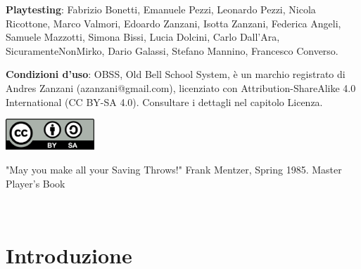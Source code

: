 \documentclass[a4paper,twoside,openany]{book}
\begin{document}
\begin{mdframed}[roundcorner=10pt]

\medskip

\textbf{Playtesting}: Fabrizio Bonetti, Emanuele Pezzi, Leonardo Pezzi, Nicola Ricottone, Marco Valmori, Edoardo Zanzani, Isotta Zanzani, Federica Angeli, Samuele Mazzotti, Simona Bissi, Lucia Dolcini, Carlo Dall'Ara, SicuramenteNonMirko, Dario Galassi, Stefano Mannino, Francesco Converso.

\bigskip

\begin{flushleft}\textbf{Condizioni d'uso}: OBSS, Old Bell School System, è un marchio registrato di Andres Zanzani (azanzani@gmail.com), licenziato con Attribution-ShareAlike 4.0 International (CC BY-SA 4.0). Consultare i dettagli nel capitolo Licenza.
\end{flushleft}

\vspace{0.5cm}

\begin{center}
\includegraphics[keepaspectratio,width=0.25\textwidth]{immagini/CC_BY-SA_icon.svg.png}
\end{center}

\medskip

\end{mdframed}

\cleardoublepage
\pagebreak
\pagebreak
\setcounter{page}{1}

\begin{multicols}{2}
{\small \tableofcontents{}}

\end{multicols}

\vfill

\begin{changemargin}{0.3cm}{0.3cm}\begin{tcolorbox}
"May you make all your Saving Throws!" Frank Mentzer, Spring 1985. Master Player's Book
\end{tcolorbox}\end{changemargin}

\pagebreak~
\pagebreak~

\setcounter{page}{1}

\section{Introduzione}
\end{document}

